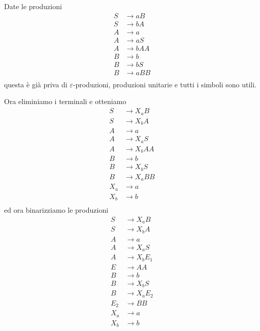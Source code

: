 \documentclass[12pt]{report}
\theoremstyle{definition}
\theoremstyle{regard}
\begin{document}
\begin{tcolorbox}[breakable]
	Date le produzioni
	\begin{align*}
		S &\rightarrow a B \\
		S &\rightarrow b A \\
		A &\rightarrow a \\
		A &\rightarrow a S \\
		A &\rightarrow b A A \\
		B &\rightarrow b \\
		B &\rightarrow b S \\
		B &\rightarrow a B B \\
	\end{align*}
	questa è già priva di $\varepsilon$-produzioni, produzioni unitarie e tutti i simboli sono utili.

	Ora eliminiamo i terminali e otteniamo
	\begin{align*}
		S &\rightarrow X_a B \\
		S &\rightarrow X_b A \\
		A &\rightarrow a \\
		A &\rightarrow X_a S \\
		A &\rightarrow X_b A A \\
		B &\rightarrow b \\
		B &\rightarrow X_b S \\
		B &\rightarrow X_a B B \\
		X_a &\rightarrow a \\
		X_b &\rightarrow b \\
	\end{align*}
	ed ora binarizziamo le produzioni
	\begin{align*}
		S &\rightarrow X_a B \\
		S &\rightarrow X_b A \\
		A &\rightarrow a \\
		A &\rightarrow X_a S \\
		A &\rightarrow X_b E_1 \\
		E &\rightarrow A A \\
		B &\rightarrow b \\
		B &\rightarrow X_b S \\
		B &\rightarrow X_a E_2 \\
		E_2 &\rightarrow B B \\
		X_a &\rightarrow a \\
		X_b &\rightarrow b \\
	\end{align*}
\end{tcolorbox}
\end{document}
